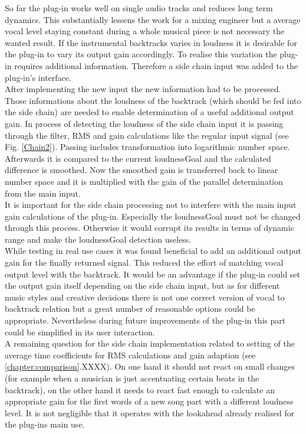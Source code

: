So far the plug-in works well on single audio tracks and reduces long term dynamics. This substantially lessens the work for a mixing engineer but a average vocal level staying constant during a whole musical piece is not necessary the wanted result. If the instrumental backtracks varies in loudness it is desirable for the plug-in to vary its output gain accordingly. To realise this variation the plug-in requires additional information. Therefore a side chain input was added to the plug-in's interface.\\
After implementing the new input the new information had to be processed. Those informations about the loudness of the backtrack (which should be fed into the side chain) are needed to enable determination of a useful additional output gain. In process of detecting the loudness of the side chain input it is passing through the filter, RMS and gain calculations like the regular input signal (see Fig. \ref{Chain2}). Passing includes transformation into logarithmic number space. Afterwards it is compared to the current loudnessGoal and the calculated difference is smoothed. Now the smoothed gain is transferred back to linear number space and it is multiplied with the gain of the parallel determination from the main input.\\
It is important for the side chain processing not to interfere with the main input gain calculations of the plug-in. Especially the loudnessGoal must not be changed through this process. Otherwise it would corrupt its results in terms of dynamic range and make the loudnessGoal detection useless.\\
While testing in real use cases it was found beneficial to add an additional output gain for the finally returned signal. This reduced the effort of matching vocal output level with the backtrack. It would be an advantage if the plug-in could set the output gain itself depending on the side chain input, but as for different music styles and creative decisions there is not one correct version of vocal to backtrack relation but a great number of reasonable options could be appropriate. Nevertheless during future improvements of the plug-in this part could be simplified in its user interaction.\\
A remaining question for the side chain implementation related to setting of the average time coefficients for RMS calculations and gain adaption (see \ref{chapter:comparison}.XXXX). On one hand it should not react on small changes (for example when a musician is just accentuating certain beats in the backtrack), on the other hand it needs to react fast enough to calculate an appropriate gain for the first words of a new song part with a different loudness level. It is not negligible that it operates with the lookahead already realised for the plug-ins main use.\\
